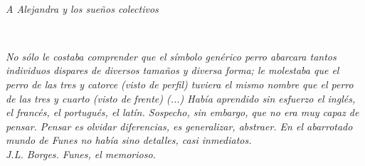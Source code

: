 
\thispagestyle{empty}

\ 

\vspace{3cm}

\begin{flushright}
\textit{A Alejandra y los sueños colectivos}
\end{flushright}

\newpage
\thispagestyle{empty}

\ 

\vspace{3cm}

\begin{flushright}
\textit{No sólo le costaba comprender que el símbolo genérico {\em perro} abarcara tantos individuos dispares de diversos tamaños y diversa forma; le molestaba que el perro de las tres y catorce (visto de perfil) tuviera el mismo nombre que el perro de las tres y cuarto (visto de frente) (...) Había aprendido sin esfuerzo el inglés, el francés, el portugués, el latín. Sospecho, sin embargo, que no era muy capaz de pensar. Pensar es olvidar diferencias, es generalizar, abstraer. En el abarrotado mundo de Funes no había sino detalles, casi inmediatos.
\\
\medskip
{\em J.L. Borges. Funes, el memorioso.~\cite{funes}}
}
\end{flushright}
